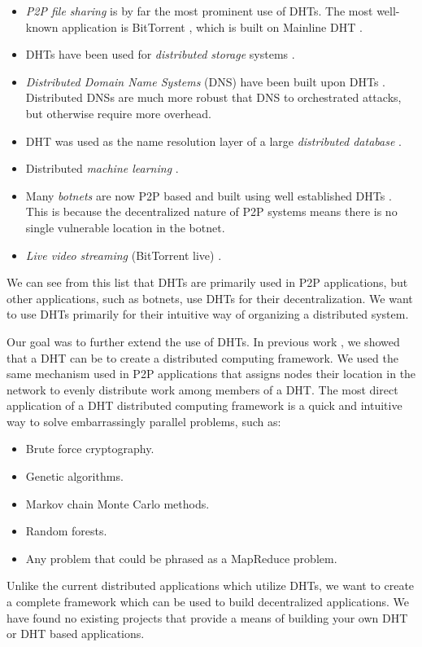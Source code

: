 \begin{itemize}
	\item \textit{P2P file sharing} is by far the most prominent use of DHTs.  
	The most well-known application is BitTorrent \cite{bittorrent}, which is built on Mainline DHT \cite{mainline}.
	\item DHTs have been used for \textit{distributed storage} systems \cite{CFS}.
	\item \textit{Distributed Domain Name Systems} (DNS) have been built upon DHTs \cite{cox2002serving} \cite{pappas2006comparative}.
	Distributed DNSs are much more robust that DNS to orchestrated attacks, but otherwise require more overhead.
	\item DHT was used as the name resolution layer of a large \textit{distributed database} \cite{Mateescu2011440}.
	\item Distributed \textit{machine learning} \cite{liparameter}.
	\item Many \textit{botnets} are now P2P based and built using well established DHTs \cite{saad2011detecting}. 
	This is because the decentralized nature of P2P systems means there is no single vulnerable location in the botnet.
	\item \textit{Live video streaming} (BitTorrent live) \cite{mol2009design}.
\end{itemize}

We can see from this list that DHTs are primarily used in P2P applications, but other applications, such as botnets, use DHTs for their decentralization.
We want to use DHTs primarily for their intuitive way of organizing a distributed system.

Our goal was to further extend the use of DHTs.
In previous work \cite{chordreduce}, we showed  that a DHT can be to create a distributed computing framework.
We used the same mechanism used in P2P applications that assigns nodes their location in the network to evenly distribute work among members of a DHT.
The most direct application of a DHT distributed computing framework is  a quick and intuitive way to solve embarrassingly parallel problems, such as:
\begin{itemize}
	\item Brute force cryptography.
	\item Genetic algorithms.
	\item Markov chain Monte Carlo methods.
	\item Random forests.
	\item Any problem that could be phrased as a MapReduce problem.
	
\end{itemize}
Unlike the current distributed applications which utilize DHTs, we want to create a complete framework which can be used to build decentralized applications.
We have found no existing projects that provide a means of building your own DHT or DHT based applications. %


